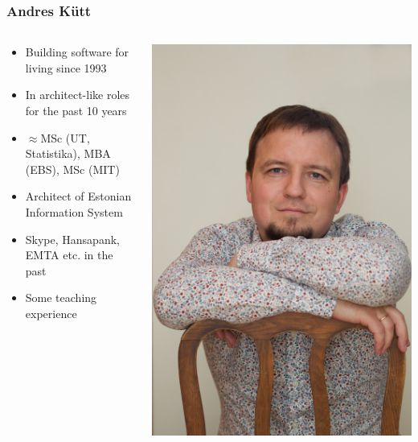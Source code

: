 \begin{frame}[fragile]
	\frametitle{Andres Kütt}
	\begin{columns}[t]
		\begin{column}{7cm}
			\begin{itemize}
				\item Building software for living since 1993
				\item In architect-like roles for the past 10 years
				\item $\approx$MSc (UT, Statistika), MBA (EBS), MSc (MIT)
				\item Architect of Estonian Information System
				\item Skype, Hansapank, EMTA etc. in the past
				\item Some teaching experience
			\end{itemize}
		\end{column}
		\begin{column}[T]{3cm}
			\includegraphics[width=\textwidth]{author.jpg}
		\end{column}
	\end{columns}
\end{frame}

